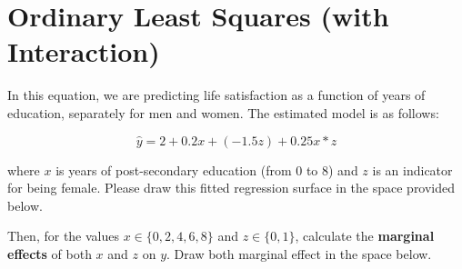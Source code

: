 \documentclass[a4paper,12pt]{article}
\begin{document}
\clearpage

\section{Ordinary Least Squares (with Interaction)}

In this equation, we are predicting life satisfaction as a function of years of education, separately for men and women. The estimated model is as follows:

\begin{equation}
\hat{y} = 2 + 0.2 x + (-1.5 z) + 0.25 x*z
\end{equation}

\noindent where $x$ is years of post-secondary education (from 0 to 8) and $z$ is an indicator for being female. Please draw this fitted regression surface in the space provided below. 

\begin{center}
\end{center}

\noindent Then, for the values $x \in \{0,2,4,6,8\}$ and $z \in \{0,1\}$, calculate the \textbf{marginal effects} of both $x$ and $z$ on $y$. Draw both marginal effect in the space below.

\begin{center}
\end{center}
\end{document}
